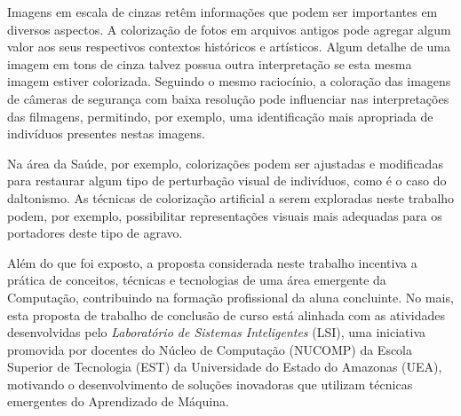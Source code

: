 Imagens em escala de cinzas retêm informações que podem ser importantes em diversos aspectos. A colorização de fotos em arquivos antigos pode agregar algum valor aos seus respectivos contextos históricos e artísticos. Algum detalhe de uma imagem em tons de cinza talvez possua outra interpretação se esta mesma imagem estiver colorizada. Seguindo o mesmo raciocínio, a coloração das imagens de câmeras de segurança com baixa resolução pode influenciar nas interpretações das filmagens, permitindo, por exemplo, uma identificação mais apropriada de indivíduos presentes nestas imagens.

Na área da Saúde, por exemplo, colorizações podem ser ajustadas e modificadas para restaurar algum tipo de perturbação visual de indivíduos, como é o caso do daltonismo. As técnicas de colorização artificial a serem exploradas neste trabalho podem, por exemplo, possibilitar representações visuais mais adequadas para os portadores deste tipo de agravo.

Além do que foi exposto, a proposta considerada neste trabalho incentiva a prática de conceitos, técnicas e tecnologias de uma área emergente da Computação, contribuindo na formação profissional da aluna concluinte. No mais, esta proposta de trabalho de conclusão de curso está alinhada com as atividades desenvolvidas pelo \emph{Laboratório de Sistemas Inteligentes} (LSI), uma iniciativa promovida por docentes do Núcleo de Computação (NUCOMP) da Escola Superior de Tecnologia (EST) da Universidade do Estado do Amazonas (UEA), motivando o desenvolvimento de soluções inovadoras que utilizam técnicas emergentes do Aprendizado de Máquina.
